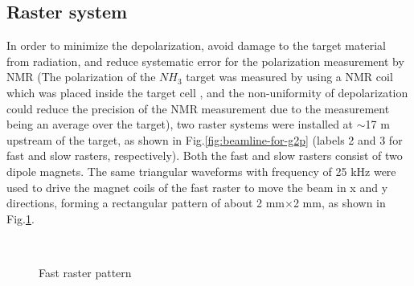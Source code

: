 \documentclass[english,review,number,sort&compress]{elsarticle}
\begin{document}
\subsection{\label{sub:Raster-system}Raster system}

In order to minimize the depolarization, avoid damage to the target material from radiation, and reduce systematic error for the polarization measurement by NMR (The polarization of the $NH_{3}$ target was measured by using a NMR coil which was placed inside the target cell \citep{Pierce201454}, and the non-uniformity of depolarization could reduce the precision of the NMR measurement due to the measurement being an average over the target), two raster systems were installed at $\sim$17 m upstream of the target, as shown in Fig.\ref{fig:beamline-for-g2p} (labels 2 and 3 for fast and slow rasters, respectively). Both the fast and slow rasters consist of two dipole magnets. The same triangular waveforms with frequency of 25 kHz were used to drive the magnet coils of the fast raster to move the beam in x and y directions, forming a rectangular pattern of about 2 mm$\times$2 mm, as shown in Fig.\ref{fig:Fast-raster}. 
\begin{figure}[tbph]
\begin{centering}
$\qquad$
\par\end{centering}

\protect\caption{\label{fig:Fast-raster}Fast raster pattern}
\end{figure}
\end{document}
